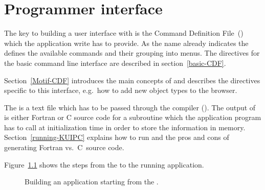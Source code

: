 
\chapter{Programmer interface}
%
%

The key to building a user interface with \KUIP{} is the Command
Definition File~(\CDF{})
which the application write has to provide. 
As the name already indicates the \CDF{} defines the available commands
and their grouping into menus.
The \CDF{} directives for the basic \KUIP{} command line interface are
described in section~\ref{basic-CDF}.

Section~\ref{Motif-CDF} introduces the main concepts of \KUIPMotif{}
and describes the \CDF{} directives specific to this interface, e.g.\ how
to add new object types to the browser. 

The \CDF{} is a text file which has to be passed through the \KUIP{}
compiler (\KUIPC{}). 
The output of \KUIPC{} is either Fortran or C source code for a subroutine
which the application program has to call at initialization time in
order to store the \CDF{} information in memory.
Section~\ref{running-KUIPC} explains how to run \KUIPC{} and the pros and
cons of generating Fortran vs.\ C~source code.
\fi

Figure~\ref{FIG8} shows the steps from the \CDF{} to the running application.
 
\begin{figure}[tb]
\begin{center}
\end{center}
\caption{Building an application starting from the \CDF{}.}
\label{FIG8}
\end{figure}

